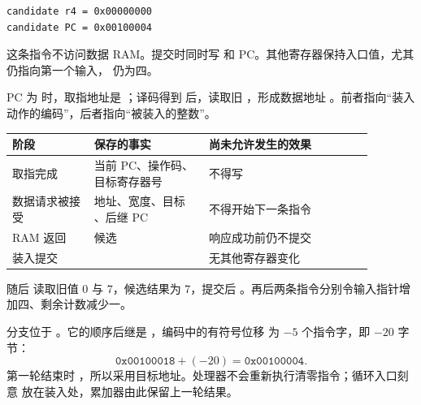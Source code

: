 \begin{lstlisting}
candidate r4 = 0x00000000
candidate PC = 0x00100004
\end{lstlisting}

这条指令不访问数据 RAM。提交时同时写  和 PC。其他寄存器保持入口值，尤其
 仍指向第一个输入， 仍为四。


PC 为  时，取指地址是 ；译码得到
 后，读取旧 ，形成数据地址
。前者指向“装入动作的编码”，后者指向“被装入的整数”。

\begin{longtable}{|L{0.20\linewidth}|L{0.28\linewidth}|L{0.40\linewidth}|}
\hline
{}
阶段 & 保存的事实 & 尚未允许发生的效果 \\ \hline
取指完成 & 当前 PC、操作码、目标寄存器号 & 不得写  \\ \hline
数据请求被接受 & 地址、宽度、目标 、后继 PC & 不得开始下一条指令 \\ \hline
RAM 返回  & 候选  & 响应成功前仍不提交 \\ \hline
装入提交 &  & 无其他寄存器变化 \\ \hline
\end{longtable}

随后  读取旧值 \(0\) 与 \(7\)，候选结果为 \(7\)，提交后
。再后两条指令分别令输入指针增加四、剩余计数减少一。


分支位于 。它的顺序后继是 ，编码中的有符号位移
为 \(-5\) 个指令字，即 \(-20\) 字节：
\[
\texttt{0x00100018}+(-20)=\texttt{0x00100004}.
\]
第一轮结束时 ，所以采用目标地址。处理器不会重新执行清零指令；循环入口刻意
放在装入处，累加器由此保留上一轮结果。

